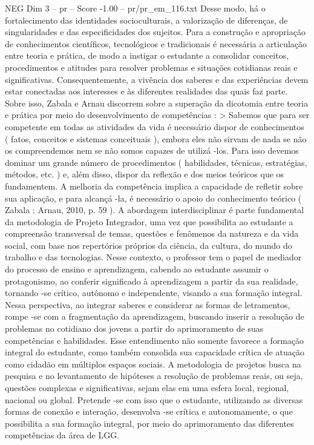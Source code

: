 \begin{textsample}{NEG Dim 3 – pr – Score -1.00 – pr/pr\_em\_116.txt}
Desse modo, há o fortalecimento das identidades socioculturais, a valorização de diferenças, de singularidades e das especificidades dos sujeitos.
Para a construção e apropriação de conhecimentos científicos, tecnológicos e tradicionais é necessária a articulação entre teoria e prática, de modo a instigar o estudante a consolidar conceitos, procedimentos e atitudes para resolver problemas e situações cotidianas reais e significativas.
Consequentemente, a vivência dos saberes e das experiências devem estar conectadas aos interesses e às diferentes realidades das quais faz parte.
Sobre isso, Zabala e Arnau discorrem sobre a superação da dicotomia entre teoria e prática por meio do desenvolvimento de competências : > Sabemos que para ser competente em todas as atividades da vida é necessário dispor de conhecimentos ( fatos, conceitos e sistemas conceituais ), embora eles não sirvam de nada se não os compreendemos nem se não somos capazes de utilizá -los.
Para isso devemos dominar um grande número de procedimentos ( habilidades, técnicas, estratégias, métodos, etc. ) e, além disso, dispor da reflexão e dos meios teóricos que os fundamentem.
A melhoria da competência implica a capacidade de refletir sobre sua aplicação, e para alcançá -la, é necessário o apoio do conhecimento teórico ( Zabala ; Arnau, 2010, p. 59 ).
A abordagem interdisciplinar é parte fundamental da metodologia de Projeto Integrador, uma vez que possibilita ao estudante a compreensão transversal de temas, questões e fenômenos da natureza e da vida social, com base nos repertórios próprios da ciência, da cultura, do mundo do trabalho e das tecnologias.
Nesse contexto, o professor tem o papel de mediador do processo de ensino e aprendizagem, cabendo ao estudante assumir o protagonismo, ao conferir significado à aprendizagem a partir da sua realidade, tornando -se crítico, autônomo e independente, visando a sua formação integral.
Nessa perspectiva, ao integrar saberes e considerar as formas de letramentos, rompe -se com a fragmentação da aprendizagem, buscando inserir a resolução de problemas no cotidiano dos jovens a partir do aprimoramento de suas competências e habilidades.
Esse entendimento não somente favorece a formação integral do estudante, como também consolida sua capacidade crítica de atuação como cidadão em múltiplos espaços sociais.
A metodologia de projetos busca na pesquisa e no levantamento de hipóteses a resolução de problemas reais, ou seja, questões complexas e significativas, sejam elas em uma esfera local, regional, nacional ou global.
Pretende -se com isso que o estudante, utilizando as diversas formas de conexão e interação, desenvolva -se crítica e autonomamente, o que possibilita a sua formação integral, por meio do aprimoramento das diferentes competências da área de LGG.

\end{textsample}
